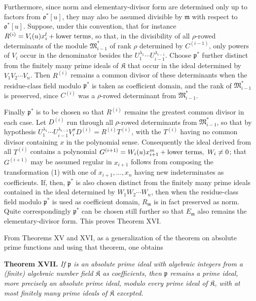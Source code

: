 \documentclass[11pt]{article}
\providecommand{\frakm}{\mathfrak m}
\providecommand{\frakp}{\mathfrak p}
\providecommand{\frakp}{\mathfrak p}
\providecommand{\frakp}{\mathfrak p}
\begin{document}
Furthermore, since norm and elementary-divisor form are determined only up to factors from $\mathfrak o^*[u]$, they may also be assumed divisible by $\frakm$ with respect to $\mathfrak o^*[u]$. Suppose, under this convention, that for instance $R^{(i)}=V_i(u)x_i^{l}+\hbox{lower terms}$, so that, in the divisibility of all $\rho$-rowed determinants of the module $\mathfrak M_{i-1}^*$ of rank $\rho$ determined by $C^{(i-1)}$, only powers of $V_i$ occur in the denominator besides the $U_1^{\lambda_1}\cdots U_{i-1}^{\lambda_{i-1}}$. Choose $\frakp^*$ further distinct from the finitely many prime ideals of $\mathfrak K$ that occur in the ideal determined by $V_1V_2\cdots V_n$. Then $R^{(i)}$ remains a common divisor of these determinants when the residue-class field modulo $\frakp^*$ is taken as coefficient domain, and the rank of $\mathfrak M_{i-1}^*$ is preserved, since $C^{(i)}$ was a $\rho$-rowed determinant from $\mathfrak M_{i-1}^*$.

Finally $\frakp^*$ is to be chosen so that $R^{(i)}$ remains the greatest common divisor in each case. Let $D^{(i)}$ run through all $\rho$-rowed determinants from $\mathfrak M_{i-1}^*$, so that by hypothesis $U_1^{\lambda_1}\cdots U_{i-1}^{\lambda_{i-1}}V_i^{\sigma}D^{(i)}=R^{(i)}T^{(i)}$, with the $T^{(i)}$ having no common divisor containing $x$ in the polynomial sense. Consequently the ideal derived from all $T^{(i)}$ contains a polynomial $G^{(i+1)}=W_i(u)x_{i+1}^{m}+\hbox{lower terms},\ W_i\ne0$; that $G^{(i+1)}$ may be assumed regular in $x_{i+1}$ follows from composing the transformation (1) with one of $x_{i+1},\ldots,x_n$ having new indeterminates as coefficients. If, then, $\frakp^*$ is also chosen distinct from the finitely many prime ideals contained in the ideal determined by $W_1W_2\cdots W_n$, then when the residue-class field modulo $\frakp^*$ is used as coefficient domain, $R_\frakm$ is in fact preserved as norm. Quite correspondingly $\frakp^*$ can be chosen still further so that $E_\frakm$ also remains the elementary-divisor form. This proves Theorem XVI.

From Theorems XV and XVI, as a generalization of the theorem on absolute prime functions and using that theorem, one obtains

\textbf{Theorem XVII.} \emph{If $\frakp$ is an absolute prime ideal with algebraic integers from a (finite) algebraic number field $\mathfrak K$ as coefficients, then $\frakp$ remains a prime ideal, more precisely an absolute prime ideal, modulo every prime ideal of $\mathfrak K$, with at most finitely many prime ideals of $\mathfrak K$ excepted.}
\end{document}

